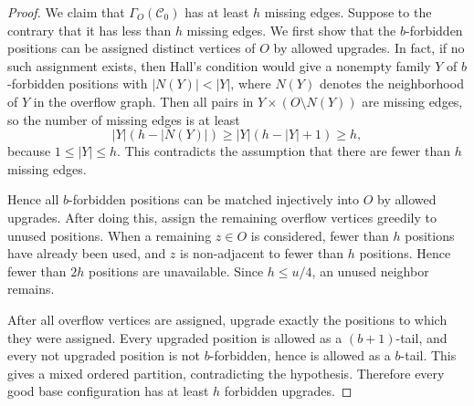 \documentclass[10pt,a4paper]{amsart}
\begin{document}
\begin{proof}
        We claim that $\Gamma_O(\mathcal C_0)$ has at least $h$ missing edges.
        Suppose to the contrary that it has less than $h$ missing edges.
        We first show that the $b$-forbidden positions can be assigned distinct vertices of $O$ by allowed upgrades.
        In fact, if no such assignment exists, then Hall's condition would give a nonempty family $Y$ of $b$-forbidden positions with $|N(Y)|<|Y|$, where $N(Y)$ denotes the neighborhood of $Y$ in the overflow graph.
        Then all pairs in $Y\times (O\setminus N(Y))$ are missing edges, so the number of missing edges is at least
        \[
                |Y|(h-|N(Y)|)
                \ge |Y|(h-|Y|+1)
                \ge h,
        \]
        because $1\le |Y|\le h$.
        This contradicts the assumption that there are fewer than $h$ missing edges.

        Hence all $b$-forbidden positions can be matched injectively into $O$ by allowed upgrades.
        After doing this, assign the remaining overflow vertices greedily to unused positions.
        When a remaining $z\in O$ is considered, fewer than $h$ positions have already been used, and $z$ is non-adjacent to fewer than $h$ positions.
        Hence fewer than $2h$ positions are unavailable.
        Since $h\le u/4$, an unused neighbor remains.

        After all overflow vertices are assigned, upgrade exactly the positions to which they were assigned.
        Every upgraded position is allowed as a $(b+1)$-tail, and every not upgraded position is not $b$-forbidden, hence is allowed as a $b$-tail.
        This gives a mixed ordered partition, contradicting the hypothesis.
        Therefore every good base configuration has at least $h$ forbidden upgrades.


\end{proof}
\end{document}
